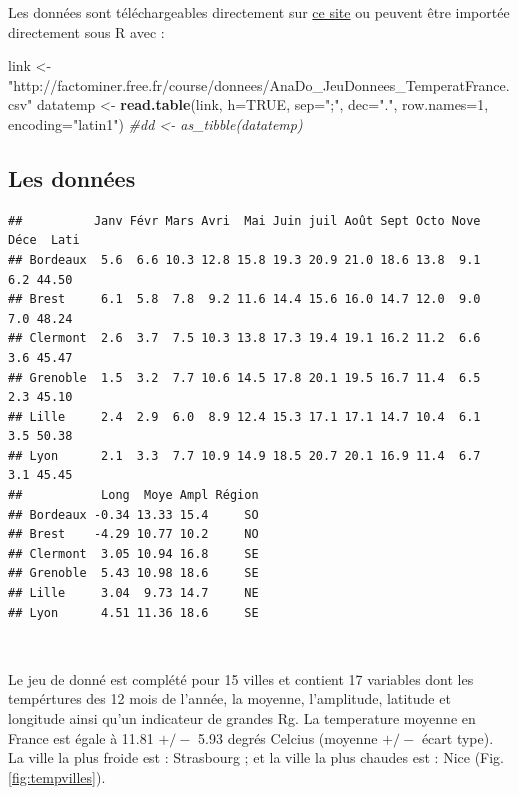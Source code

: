 \documentclass[
]{article}
\newenvironment{Shaded}{\begin{snugshade}}{\end{snugshade}}
\newcommand{\CommentTok}[1]{\textcolor[rgb]{0.56,0.35,0.01}{\textit{#1}}}
\newcommand{\DataTypeTok}[1]{\textcolor[rgb]{0.13,0.29,0.53}{#1}}
\newcommand{\DecValTok}[1]{\textcolor[rgb]{0.00,0.00,0.81}{#1}}
\newcommand{\KeywordTok}[1]{\textcolor[rgb]{0.13,0.29,0.53}{\textbf{#1}}}
\newcommand{\NormalTok}[1]{#1}
\newcommand{\OtherTok}[1]{\textcolor[rgb]{0.56,0.35,0.01}{#1}}
\newcommand{\StringTok}[1]{\textcolor[rgb]{0.31,0.60,0.02}{#1}}
\begin{document}
Les données sont téléchargeables directement sur
\href{https://husson.github.io/data.html}{ce site} ou peuvent être
importée directement sous R avec :

\begin{Shaded}
\begin{Highlighting}[]
\NormalTok{link <-}\StringTok{ "http://factominer.free.fr/course/donnees/AnaDo_JeuDonnees_TemperatFrance.csv"}
\NormalTok{datatemp <-}\StringTok{ }\KeywordTok{read.table}\NormalTok{(link, }\DataTypeTok{h=}\OtherTok{TRUE}\NormalTok{, }\DataTypeTok{sep=}\StringTok{";"}\NormalTok{, }\DataTypeTok{dec=}\StringTok{"."}\NormalTok{, }\DataTypeTok{row.names=}\DecValTok{1}\NormalTok{, }\DataTypeTok{encoding=}\StringTok{"latin1"}\NormalTok{)}
\CommentTok{#dd <- as_tibble(datatemp)}
\end{Highlighting}
\end{Shaded}

\hypertarget{les-donnuxe9es}{%
\subsection{\texorpdfstring{\textbf{Les
données}}{Les données}}\label{les-donnuxe9es}}

\begin{verbatim}
##          Janv Févr Mars Avri  Mai Juin juil Août Sept Octo Nove Déce  Lati
## Bordeaux  5.6  6.6 10.3 12.8 15.8 19.3 20.9 21.0 18.6 13.8  9.1  6.2 44.50
## Brest     6.1  5.8  7.8  9.2 11.6 14.4 15.6 16.0 14.7 12.0  9.0  7.0 48.24
## Clermont  2.6  3.7  7.5 10.3 13.8 17.3 19.4 19.1 16.2 11.2  6.6  3.6 45.47
## Grenoble  1.5  3.2  7.7 10.6 14.5 17.8 20.1 19.5 16.7 11.4  6.5  2.3 45.10
## Lille     2.4  2.9  6.0  8.9 12.4 15.3 17.1 17.1 14.7 10.4  6.1  3.5 50.38
## Lyon      2.1  3.3  7.7 10.9 14.9 18.5 20.7 20.1 16.9 11.4  6.7  3.1 45.45
##           Long  Moye Ampl Région
## Bordeaux -0.34 13.33 15.4     SO
## Brest    -4.29 10.77 10.2     NO
## Clermont  3.05 10.94 16.8     SE
## Grenoble  5.43 10.98 18.6     SE
## Lille     3.04  9.73 14.7     NE
## Lyon      4.51 11.36 18.6     SE
\end{verbatim}

~

Le jeu de donné est complété pour 15 villes et contient 17 variables
dont les tempértures des 12 mois de l'année, la moyenne, l'amplitude,
latitude et longitude ainsi qu'un indicateur de grandes Rg. La
temperature moyenne en France est égale à 11.81 \(+/-\) 5.93 degrés
Celcius (moyenne \(+/-\) écart type). La ville la plus froide est :
Strasbourg ; et la ville la plus chaudes est : Nice (Fig.
\ref{fig:tempvilles}).
\end{document}

